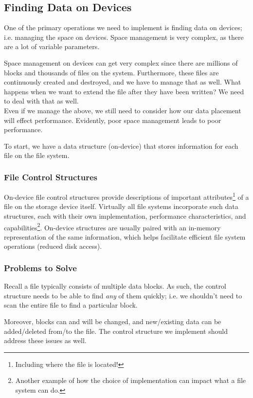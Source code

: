 \documentclass{report}
\newcommand{\exampleBegin}[1]{\begin{tcolorbox}[colback=blue!5!white,colframe=black!75!blue,title={Example:
      #1}]}
\newcommand{\exampleEnd}{\end{tcolorbox}}
\begin{document}
\subsection{Finding Data on Devices}
One of the primary operations we need to implement is finding data on devices; i.e. managing the
space on devices. Space management is very complex, as there are a lot of variable parameters.

\exampleBegin{Harder Tetris}
Space management on devices can get very complex since there are millions of blocks and thousands of
files on the system. Furthermore, these files are continuously created and destroyed, and we have to
manage that as well. What happens when we want to extend the file after they have been written? We
need to deal with that as well. \\

Even if we manage the above, we still need to consider how our data placement will effect
performance. Evidently, poor space management leads to poor performance.
\exampleEnd

To start, we have a data structure (on-device) that stores information for each file on the file
system. 


\subsubsection{File Control Structures}
\label{subsubsec:FCS}
On-device file control structures provide descriptions of important attributes\footnote{Including
  where the file is located!} of a file on the storage device itself. Virtually all file systems
incorporate such data structures, each with their own implementation, performance characteristics,
and capabilities\footnote{Another example of how the choice of implementation can impact what a file
  system can do.}. On-device structures are usually paired with an in-memory representation of the
same information, which helps facilitate efficient file system operations (reduced disk access).


\subsubsection{Problems to Solve}
Recall a file typically consists of multiple data blocks. As such, the control structure needs to be
able to find \textit{any} of them quickly; i.e. we shouldn't need to scan the entire file to find a
particular block.

Moreover, blocks can and will be changed, and new/existing data can be added/deleted from/to the
file. The control structure we implement should address these issues as well.
\end{document}
